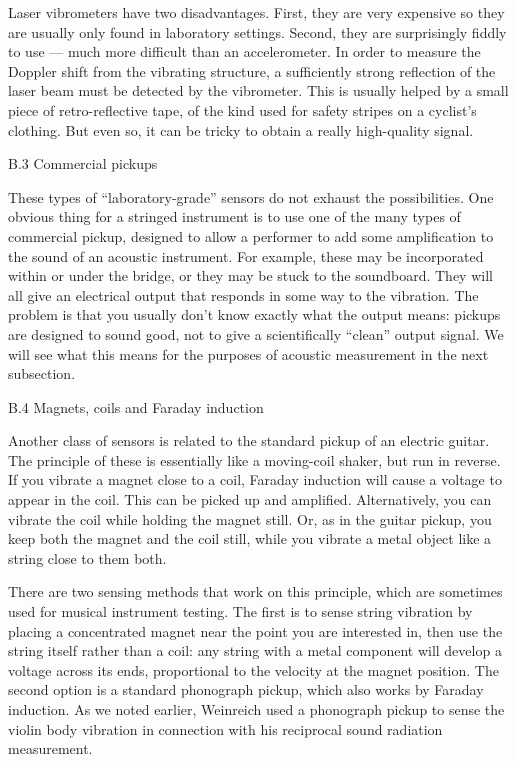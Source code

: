   Laser vibrometers have two disadvantages. First, they are very expensive so 
  they are usually only found in laboratory settings. Second, they are 
  surprisingly fiddly to use — much more difficult than an accelerometer. In 
  order to measure the Doppler shift from the vibrating structure, a 
  sufficiently strong reflection of the laser beam must be detected by the 
  vibrometer. This is usually helped by a small piece of retro-reflective tape, 
  of the kind used for safety stripes on a cyclist’s clothing. But even so, it 
  can be tricky to obtain a really high-quality signal. 

  B.3 Commercial pickups 

  These types of “laboratory-grade” sensors do not exhaust the possibilities. 
  One obvious thing for a stringed instrument is to use one of the many types 
  of commercial pickup, designed to allow a performer to add some amplification 
  to the sound of an acoustic instrument. For example, these may be 
  incorporated within or under the bridge, or they may be stuck to the 
  soundboard. They will all give an electrical output that responds in some way 
  to the vibration. The problem is that you usually don’t know exactly what the 
  output means: pickups are designed to sound good, not to give a 
  scientifically “clean” output signal. We will see what this means for the 
  purposes of acoustic measurement in the next subsection. 

  B.4 Magnets, coils and Faraday induction 

  Another class of sensors is related to the standard pickup of an electric 
  guitar. The principle of these is essentially like a moving-coil shaker, but 
  run in reverse. If you vibrate a magnet close to a coil, Faraday induction 
  will cause a voltage to appear in the coil. This can be picked up and 
  amplified. Alternatively, you can vibrate the coil while holding the magnet 
  still. Or, as in the guitar pickup, you keep both the magnet and the coil 
  still, while you vibrate a metal object like a string close to them both. 

  There are two sensing methods that work on this principle, which are 
  sometimes used for musical instrument testing. The first is to sense string 
  vibration by placing a concentrated magnet near the point you are interested 
  in, then use the string itself rather than a coil: any string with a metal 
  component will develop a voltage across its ends, proportional to the 
  velocity at the magnet position. The second option is a standard phonograph 
  pickup, which also works by Faraday induction. As we noted earlier, Weinreich 
  used a phonograph pickup to sense the violin body vibration in connection 
  with his reciprocal sound radiation measurement. 

